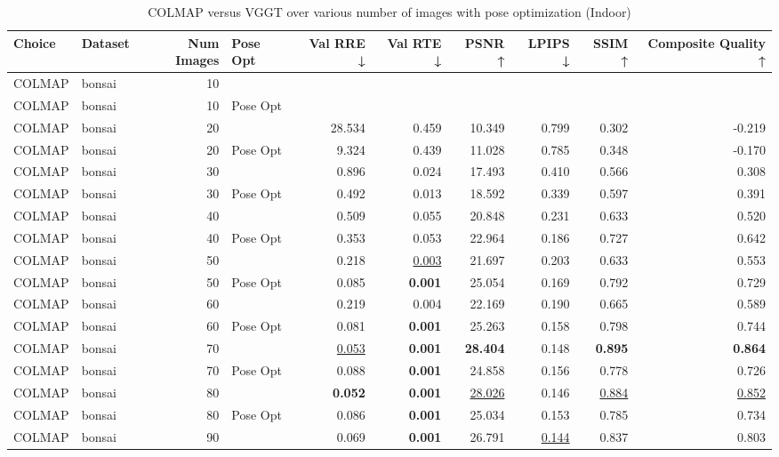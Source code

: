 \begin{table}[H]
\caption{\ifdefined\customcaption \customcaption \else COLMAP versus VGGT over various number of images with pose optimization (Indoor) \fi}
\label{tab:01_num_images_pose_opt_indoor}
\centering
\scriptsize
\begin{tabular}{llrlrrrrrr}
\toprule
Choice & Dataset & Num Images & Pose Opt & Val RRE ↓ & Val RTE ↓ & PSNR ↑ & LPIPS ↓ & SSIM ↑ & Composite Quality ↑ \\
\midrule
COLMAP & bonsai & 10 &  &  &  &  &  &  &  \\
COLMAP & bonsai & 10 & Pose Opt &  &  &  &  &  &  \\
COLMAP & bonsai & 20 &  & 28.534 & 0.459 & 10.349 & 0.799 & 0.302 & -0.219 \\
COLMAP & bonsai & 20 & Pose Opt & 9.324 & 0.439 & 11.028 & 0.785 & 0.348 & -0.170 \\
COLMAP & bonsai & 30 &  & 0.896 & 0.024 & 17.493 & 0.410 & 0.566 & 0.308 \\
COLMAP & bonsai & 30 & Pose Opt & 0.492 & 0.013 & 18.592 & 0.339 & 0.597 & 0.391 \\
COLMAP & bonsai & 40 &  & 0.509 & 0.055 & 20.848 & 0.231 & 0.633 & 0.520 \\
COLMAP & bonsai & 40 & Pose Opt & 0.353 & 0.053 & 22.964 & 0.186 & 0.727 & 0.642 \\
COLMAP & bonsai & 50 &  & 0.218 & \underline{0.003} & 21.697 & 0.203 & 0.633 & 0.553 \\
COLMAP & bonsai & 50 & Pose Opt & 0.085 & \textbf{0.001} & 25.054 & 0.169 & 0.792 & 0.729 \\
COLMAP & bonsai & 60 &  & 0.219 & 0.004 & 22.169 & 0.190 & 0.665 & 0.589 \\
COLMAP & bonsai & 60 & Pose Opt & 0.081 & \textbf{0.001} & 25.263 & 0.158 & 0.798 & 0.744 \\
COLMAP & bonsai & 70 &  & \underline{0.053} & \textbf{0.001} & \textbf{28.404} & 0.148 & \textbf{0.895} & \textbf{0.864} \\
COLMAP & bonsai & 70 & Pose Opt & 0.088 & \textbf{0.001} & 24.858 & 0.156 & 0.778 & 0.726 \\
COLMAP & bonsai & 80 &  & \textbf{0.052} & \textbf{0.001} & \underline{28.026} & 0.146 & \underline{0.884} & \underline{0.852} \\
COLMAP & bonsai & 80 & Pose Opt & 0.086 & \textbf{0.001} & 25.034 & 0.153 & 0.785 & 0.734 \\
COLMAP & bonsai & 90 &  & 0.069 & \textbf{0.001} & 26.791 & \underline{0.144} & 0.837 & 0.803 \\

\end{tabular}
\end{table}
